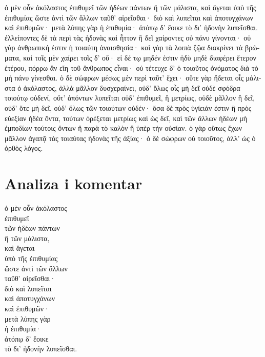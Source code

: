 {\large

\begin{greek}

\noindent  ὁ μὲν οὖν ἀκόλαστος ἐπιθυμεῖ τῶν ἡδέων πάντων ἢ τῶν μάλιστα, καὶ ἄγεται ὑπὸ τῆς ἐπιθυμίας ὥστε ἀντὶ τῶν ἄλλων ταῦθ' αἱρεῖσθαι· διὸ καὶ λυπεῖται καὶ ἀποτυγχάνων καὶ ἐπιθυμῶν· μετὰ λύπης γὰρ ἡ ἐπιθυμία· ἀτόπῳ δ' ἔοικε τὸ δι' ἡδονὴν λυπεῖσθαι. ἐλλείποντες δὲ τὰ περὶ τὰς ἡδονὰς καὶ ἧττον ἢ δεῖ χαίροντες οὐ πάνυ γίνονται· οὐ γὰρ ἀνθρωπική ἐστιν ἡ τοιαύτη ἀναισθησία· καὶ γὰρ τὰ λοιπὰ ζῷα διακρίνει τὰ βρώματα, καὶ τοῖς μὲν χαίρει τοῖς δ' οὔ· εἰ δέ τῳ μηδέν ἐστιν ἡδὺ μηδὲ διαφέρει ἕτερον ἑτέρου, πόρρω ἂν εἴη τοῦ ἄνθρωπος εἶναι· οὐ τέτευχε δ' ὁ τοιοῦτος ὀνόματος διὰ τὸ μὴ πάνυ γίνεσθαι. ὁ δὲ σώφρων μέσως μὲν περὶ ταῦτ' ἔχει· οὔτε γὰρ ἥδεται οἷς μάλιστα ὁ ἀκόλαστος, ἀλλὰ μᾶλλον δυσχεραίνει, οὐδ' ὅλως οἷς μὴ δεῖ οὐδὲ σφόδρα τοιούτῳ οὐδενί, οὔτ' ἀπόντων λυπεῖται οὐδ' ἐπιθυμεῖ, ἢ μετρίως, οὐδὲ μᾶλλον ἢ δεῖ, οὐδ' ὅτε μὴ δεῖ, οὐδ' ὅλως τῶν τοιούτων οὐδέν· ὅσα δὲ πρὸς ὑγίειάν ἐστιν ἢ πρὸς εὐεξίαν ἡδέα ὄντα, τούτων ὀρέξεται μετρίως καὶ ὡς δεῖ, καὶ τῶν ἄλλων ἡδέων μὴ ἐμποδίων τούτοις ὄντων ἢ παρὰ τὸ καλὸν ἢ ὑπὲρ τὴν οὐσίαν. ὁ γὰρ οὕτως ἔχων μᾶλλον ἀγαπᾷ τὰς τοιαύτας ἡδονὰς τῆς ἀξίας· ὁ δὲ σώφρων οὐ τοιοῦτος, ἀλλ' ὡς ὁ ὀρθὸς λόγος.
\end{greek}

}


\section*{Analiza i komentar}


{\large
\begin{greek}
\noindent  ὁ μὲν οὖν ἀκόλαστος\\
ἐπιθυμεῖ \\
\tabto{2em} τῶν ἡδέων πάντων \\
\tabto{2em} ἢ τῶν μάλιστα, \\

\noindent καὶ ἄγεται \\
\tabto{2em} ὑπὸ τῆς ἐπιθυμίας \\
\tabto{2em} ὥστε ἀντὶ τῶν ἄλλων \\
\tabto{4em} ταῦθ' αἱρεῖσθαι· \\
διὸ καὶ λυπεῖται \\
\tabto{4em} καὶ ἀποτυγχάνων \\
\tabto{4em} καὶ ἐπιθυμῶν·\\
\tabto{2em} μετὰ λύπης γὰρ \\
\tabto{4em} ἡ ἐπιθυμία· \\
\tabto{2em} ἀτόπῳ δ' ἔοικε \\
\tabto{4em} τὸ δι' ἡδονὴν λυπεῖσθαι. \\

\end{greek}
}

